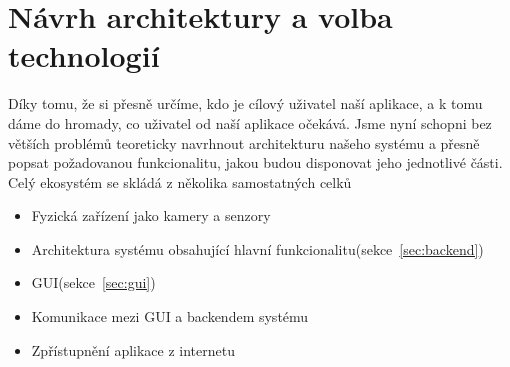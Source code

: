 \section{Návrh architektury a volba technologií}\label{sec:navrh-architektury-a-volba-technologii}
Díky tomu, že si přesně určíme, kdo je cílový uživatel naší aplikace, a k tomu dáme do hromady, co uživatel od naší aplikace očekává.
Jsme nyní schopni bez větších problémů teoreticky navrhnout architekturu našeho systému a přesně popsat požadovanou funkcionalitu, jakou budou disponovat jeho jednotlivé části.
Celý ekosystém se skládá z několika samostatných celků
\begin{itemize}
    \item Fyzická zařízení jako kamery a senzory
    \item Architektura systému obsahující hlavní funkcionalitu(sekce~\ref{sec:backend})
    \item GUI(sekce~\ref{sec:gui})
    \item Komunikace mezi GUI a backendem systému
    \item Zpřístupnění aplikace z internetu
\end{itemize}

